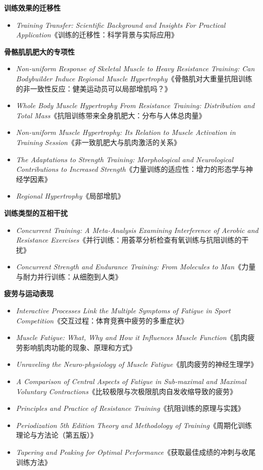 \documentclass[fontset=fandol, a4paper, 12pt, openright]{ctexbook}
\begin{document}
\textbf{训练效果的迁移性}
\begin{itemize}
    \item \textit{Training Transfer: Scientific Background and Insights For Practical Application}《训练的迁移性：科学背景与实际应用》
\end{itemize}

\textbf{骨骼肌肌肥大的专项性}
\begin{itemize}
    \item \textit{Non-uniform Response of Skeletal Muscle to Heavy Resistance Training: Can Bodybuilder Induce Regional Muscle Hypertrophy}《骨骼肌对大重量抗阻训练的非一致性反应：健美运动员可以局部增肌吗？》
    \item \textit{Whole Body Muscle Hypertrophy From Resistance Training: Distribution and Total Mass}《抗阻训练带来全身肌肥大：分布与人体总肉量》
    \item \textit{Non-uniform Muscle Hypertrophy: Its Relation to Muscle Activation in Training Session}《非一致肌肥大与肌肉激活的关系》
    \item \textit{The Adaptations to Strength Training: Morphological and Neurological Contributions to Increased Strength}《力量训练的适应性：增力的形态学与神经学因素》
    \item \textit{Regional Hypertrophy}《局部增肌》
\end{itemize}

\textbf{训练类型的互相干扰}
\begin{itemize}
    \item \textit{Concurrent Training: A Meta-Analysis Examining Interference of Aerobic and Resistance Exercises}《并行训练：用荟萃分析检查有氧训练与抗阻训练的干扰》
    \item \textit{Concurrent Strength and Endurance Training: From Molecules to Man}《力量与耐力并行训练：从细胞到人类》
\end{itemize}

\textbf{疲劳与运动表现}
\begin{itemize}
    \item \textit{Interactive Processes Link the Multiple Symptoms of Fatigue in Sport Competition}《交互过程：体育竞赛中疲劳的多重症状》
    \item \textit{Muscle Fatigue: What, Why and How it Influences Muscle Function}《肌肉疲劳影响肌肉功能的现象、原理和方式》
    \item \textit{Unraveling the Neuro-physiology of Muscle Fatigue}《肌肉疲劳的神经生理学》
    \item \textit{A Comparison of Central Aspects of Fatigue in Sub-maximal and Maximal Voluntary Contractions}《比较极限与次极限肌肉自发收缩导致的疲劳》
    \item \textit{Principles and Practice of Resistance Training}《抗阻训练的原理与实践》
    \item \textit{Periodization 5th Edition Theory and Methodology of Training}《周期化训练理论与方法论（第五版）》
    \item \textit{Tapering and Peaking for Optimal Performance}《获取最佳成绩的冲刺与收尾训练方法》
\end{itemize}
\end{document}
